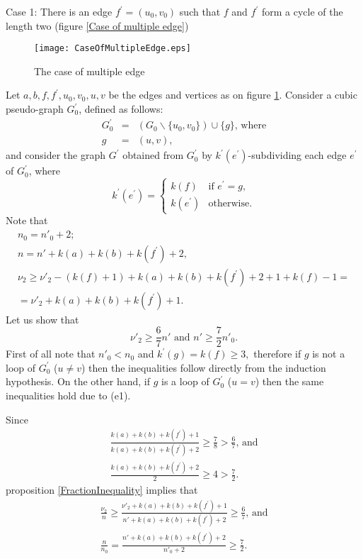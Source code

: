 \documentclass[fleqn,12pt,twoside]{article}
\newenvironment{proof}[1][Proof.]{\begin{trivlist}
\item[\hskip \labelsep {\bfseries #1}]}{\end{trivlist}}
\begin{document}
\begin{proof}
Case 1: There is an edge $f^{\prime }=(u_{0},v_{0})$ such that $f$ and $f^{\prime }$ form a cycle of the length two (figure \ref{Case of
multiple edge})

\begin{figure}[h]
\begin{center}
\texttt{[image: CaseOfMultipleEdge.eps]}\\
\caption{The case of multiple edge}\label{Case of multiple edge}
\end{center}
\end{figure}

Let $a,b,f,f^{\prime },u_{0},v_{0},u,v$ be the edges and vertices as
on
figure \ref{Case of multiple edge}. Consider a cubic pseudo-graph $G_{0}^{\prime }$, defined as follows:\begin{eqnarray*}
G_{0}^{\prime } &=&(G_{0}\backslash \{u_{0},v_{0}\})\cup
\{g\}\text{, where}
\\
g &=&(u,v)\text{,}
\end{eqnarray*}and consider the graph $G^{\prime }$ obtained from $G_{0}^{\prime }$ by $k^{\prime }(e^{\prime })$-subdividing each edge $e^{\prime }$ of $G_{0}^{\prime }$, where
\begin{equation*}
k^{\prime }(e^{\prime })=\left\{
\begin{array}{ll}
k(f) & \text{if }e^{\prime }=g\text{,} \\
k(e^{\prime }) & \text{otherwise.}\end{array}\right.
\end{equation*}Note that
\begin{gather*}
n_0=n'_0+2;
\\
n =n'+k(a)+k(b)+k(f^{\prime })+2\text{,} \\
\nu _{2}\geq \nu' _{2}-(k(f)+1)+k(a)+k(b)+k(f^{\prime
})+2+1+k(f)-1= \\
=\nu' _{2}+k(a)+k(b)+k(f^{\prime })+1.
\end{gather*}Let us show that
\begin{equation*}
\nu' _{2}\geq \frac{6}{7}n' \text{ and }n'\geq \frac{7}{2}n'_0.
\end{equation*}First of all note that $n'_0 <n_0$ and $k^{\prime }(g)=k(f)\geq 3,$
therefore if $g$ is not a loop of $G_{0}^{\prime }$ ($u\neq v$) then
the inequalities follow directly from the induction hypothesis. On
the other hand, if $g$ is a loop of $G_{0}^{\prime }$ ($u=v$) then
the same inequalities hold due to (e1).

Since
\begin{gather*}
\frac{k(a)+k(b)+k(f^{\prime })+1}{k(a)+k(b)+k(f^{\prime })+2}\geq \frac{7}{8}>\frac{6}{7}\text{, and} \\
\frac{k(a)+k(b)+k(f^{\prime })+2}{2}\geq 4>\frac{7}{2}\text{.}
\end{gather*}proposition \ref{FractionInequality} implies that
\begin{gather*}
\frac{\nu _{2}}{n }\geq \frac{\nu' _{2}+k(a)+k(b)+k(f^{\prime
})+1}{n'+k(a)+k(b)+k(f^{\prime })+2}\geq \frac{6}{7}\text{, and} \\
\frac{n}{n_0}=\frac{n'+k(a)+k(b)+k(f^{\prime })+2}{n'_0+2}\geq
\frac{7}{2}.
\end{gather*}


\end{proof}
\end{document}
